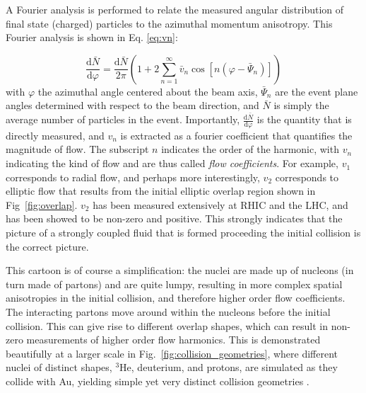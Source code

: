 A Fourier analysis is performed to relate the measured angular distribution of final state (charged) particles to the azimuthal momentum anisotropy. This Fourier analysis is shown in Eq. \ref{eq:vn}:

  \begin{equation}
    \frac{\mathrm{d}\bar{N}}{\mathrm{d}\varphi} = \frac{\mathrm{d}\bar{N}}{2\pi} \left(1 + 2\sum^\infty_{n=1}\bar{v}_n\cos[n(\varphi - \bar\Psi_n)]\right)
    \label{eq:vn}
  \end{equation}
with $\varphi$ the azimuthal angle centered about the beam axis, $\bar\Psi_n$ are the event plane angles determined with respect to the beam direction, and $\bar{N}$ is simply the average number of particles in the event. Importantly, $\frac{\mathrm{d}\bar{N}}{\mathrm{d}\varphi}$ is the quantity that is directly measured, and $v_n$ is extracted as a fourier coefficient that quantifies the magnitude of flow. The subscript $n$ indicates the order of the harmonic, with $v_n$ indicating the kind of flow and are thus called \textit{flow coefficients}. For example, $v_1$ corresponds to radial flow, and perhaps more interestingly, $v_2$ corresponds to elliptic flow that results from the initial elliptic overlap region shown in Fig~\ref{fig:overlap}. $v_2$ has been measured extensively at RHIC and the LHC, and has been showed to be non-zero and positive. This strongly indicates that the picture of a strongly coupled fluid that is formed proceeding the initial collision is the correct picture.  

  
  This cartoon is of course a simplification: the nuclei are made up of nucleons (in turn made of partons) and are quite lumpy, resulting in more complex spatial anisotropies in the initial collision, and therefore higher order flow coefficients. The interacting partons move around within the nucleons before the initial collision. This can give rise to different overlap shapes, which can result in non-zero measurements of higher order flow harmonics. This is demonstrated beautifully at a larger scale in Fig.~\ref{fig:collision_geometries}, where different nuclei of distinct shapes, $^3$He, deuterium, and protons, are simulated as they collide with Au, yielding simple yet very distinct collision geometries \cite{Aidala2019}. 

